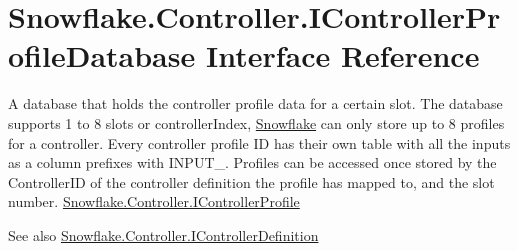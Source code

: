\hypertarget{interface_snowflake_1_1_controller_1_1_i_controller_profile_database}{}\section{Snowflake.\+Controller.\+I\+Controller\+Profile\+Database Interface Reference}
\label{interface_snowflake_1_1_controller_1_1_i_controller_profile_database}


A database that holds the controller profile data for a certain slot. The database supports 1 to 8 slots or \textquotesingle{}controller\+Index\textquotesingle{}, \hyperlink{namespace_snowflake}{Snowflake} can only store up to 8 profiles for a controller. Every controller profile I\+D has their own table with all the inputs as a column prefixes with \textquotesingle{}I\+N\+P\+U\+T\+\_\+\textquotesingle{}. Profiles can be accessed once stored by the Controller\+I\+D of the controller definition the profile has mapped to, and the slot number. \hyperlink{interface_snowflake_1_1_controller_1_1_i_controller_profile}{Snowflake.\+Controller.\+I\+Controller\+Profile} \begin{DoxySeeAlso}{See also}
\hyperlink{interface_snowflake_1_1_controller_1_1_i_controller_definition}{Snowflake.\+Controller.\+I\+Controller\+Definition}


\end{DoxySeeAlso}
 


